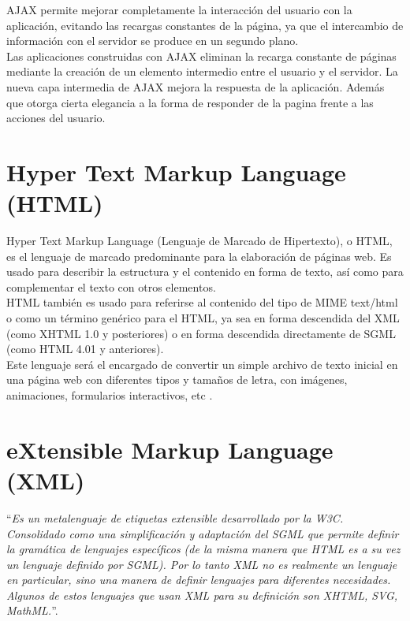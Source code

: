 AJAX permite mejorar completamente la interacci\'on del usuario con la aplicaci\'on, evitando las recargas constantes de la p\'agina, ya que el intercambio de informaci\'on con el servidor se produce en un segundo plano.\\

Las aplicaciones construidas con AJAX eliminan la recarga constante de p\'aginas mediante la creaci\'on de un elemento intermedio entre el usuario y el servidor. La nueva capa intermedia de AJAX mejora la respuesta de la aplicaci\'on. Adem\'as que otorga cierta elegancia a la forma de responder de la pagina frente a las acciones del usuario.

\section{Hyper Text Markup Language (HTML)}
Hyper Text Markup Language (Lenguaje de Marcado de Hipertexto), o HTML, es el lenguaje de marcado predominante para la elaboraci\'on de p\'aginas web. Es usado para describir la estructura y el contenido en forma de texto, as\'i como para complementar el texto con otros elementos.\\

HTML tambi\'en es usado para referirse al contenido del tipo de MIME text/html o como un t\'ermino gen\'erico para el HTML, ya sea en forma descendida del XML (como XHTML 1.0 y posteriores) o en forma descendida directamente de SGML (como HTML 4.01 y anteriores).\\

Este lenguaje ser\'a el encargado de convertir un simple archivo de texto inicial en una p\'agina web con diferentes tipos y tama\~nos de letra, con im\'agenes, animaciones, formularios interactivos, etc \cite{html}.

\section{eXtensible Markup Language (XML)}
``\textit{Es un metalenguaje de etiquetas extensible desarrollado por la W3C. Consolidado como una simplificaci\'on y adaptaci\'on del SGML que permite definir la gram\'atica de lenguajes espec\'ificos (de la misma manera que HTML es a su vez un lenguaje definido por SGML). Por lo tanto XML no es realmente un lenguaje en particular, sino una manera de definir lenguajes para diferentes necesidades. Algunos de estos lenguajes que usan XML para su definici\'on son XHTML, SVG, MathML.}''. \cite{xml}\\

